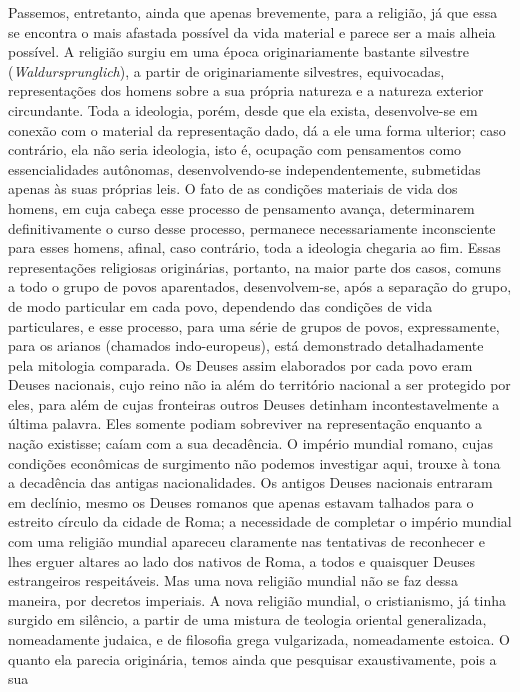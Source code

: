 Passemos, entretanto, ainda que apenas brevemente, para a religião, já
que essa se encontra o mais afastada possível da vida material e parece
ser a mais alheia possível. A religião surgiu em uma época
originariamente bastante silvestre (\emph{Waldursprunglich}), a partir
de originariamente silvestres, equivocadas, representações dos homens
sobre a sua própria natureza e a natureza exterior circundante. Toda a
ideologia, porém, desde que ela exista, desenvolve-se em conexão com o
material da representação dado, dá a ele uma forma ulterior; caso
contrário, ela não seria ideologia, isto é, ocupação com pensamentos
como essencialidades autônomas, desenvolvendo-se independentemente,
submetidas apenas às suas próprias leis. O fato de as condições
materiais de vida dos homens, em cuja cabeça esse processo de pensamento
avança, determinarem definitivamente o curso desse processo, permanece
necessariamente inconsciente para esses homens, afinal, caso contrário,
toda a ideologia chegaria ao fim. Essas representações religiosas
originárias, portanto, na maior parte dos casos, comuns a todo o grupo
de povos aparentados, desenvolvem-se, após a separação do grupo, de modo
particular em cada povo, dependendo das condições de vida particulares,
e esse processo, para uma série de grupos de povos, expressamente, para
os arianos (chamados indo-europeus), está demonstrado detalhadamente
pela mitologia comparada. Os Deuses assim elaborados por cada povo eram
Deuses nacionais, cujo reino não ia além do território nacional a ser
protegido por eles, para além de cujas fronteiras outros Deuses detinham
incontestavelmente a última palavra. Eles somente podiam sobreviver na
representação enquanto a nação existisse; caíam com a sua decadência. O
império mundial romano, cujas condições econômicas de surgimento não
podemos investigar aqui, trouxe à tona a decadência das antigas
nacionalidades. Os antigos Deuses nacionais entraram em declínio, mesmo
os Deuses romanos que apenas estavam talhados para o estreito círculo da
cidade de Roma; a necessidade de completar o império mundial com uma
religião mundial apareceu claramente nas tentativas de reconhecer e lhes
erguer altares ao lado dos nativos de Roma, a todos e quaisquer Deuses
estrangeiros respeitáveis. Mas uma nova religião mundial não se faz
dessa maneira, por decretos imperiais. A nova religião mundial, o
cristianismo, já tinha surgido em silêncio, a partir de uma mistura de
teologia oriental generalizada, nomeadamente judaica, e de filosofia
grega vulgarizada, nomeadamente estoica. O quanto ela parecia
originária, temos ainda que pesquisar exaustivamente, pois a sua
